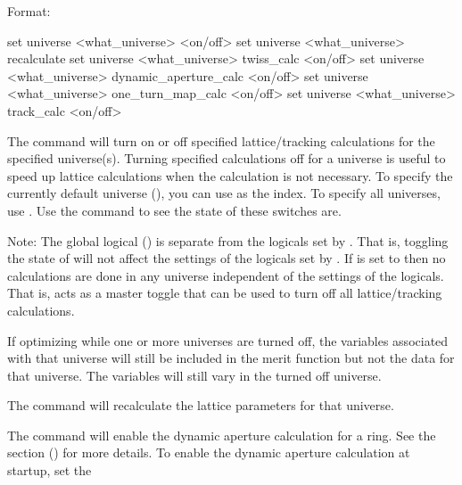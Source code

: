 {{{{{Format:
\begin{example}
  set universe <what_universe> <on/off>
  set universe <what_universe> recalculate
  set universe <what_universe> twiss_calc <on/off>
  set universe <what_universe> dynamic_aperture_calc <on/off>
  set universe <what_universe> one_turn_map_calc <on/off>
  set universe <what_universe> track_calc <on/off>
\end{example}

The  command will turn on or off specified lattice/tracking
calculations for the specified universe(s). Turning specified calculations off for a universe is
useful to speed up lattice calculations when the calculation is not necessary. To specify the
currently default universe (), you can use  as the 
index. To specify all universes, use \vn{*}. Use the  command to see the state of
these switches are.

Note: The global logical  () is separate from the logicals set
by . That is, toggling the state of  will not affect the
settings of the logicals set by . If  is set to  then
no calculations are done in any universe independent of the settings of the 
logicals. That is,  acts as a master toggle that can be used to turn off all
lattice/tracking calculations.

If optimizing while one or more universes are turned off, the variables associated with that
universe will still be included in the merit function but not the data for that universe. The
variables will still vary in the turned off universe.

The  command will recalculate the lattice parameters
for that universe.

The  command will enable the dynamic aperture
calculation for a ring. See the  section () for
more details. To enable the dynamic aperture calculation at startup, set the
\vn{design_lattice(i)%

The \vn{set universe <what_universe> one_turn_map_calc} command will enable a one-turn-map
calculation for a ring using PTC, and populate the normal form taylor maps. See
Eq.~\ref{normalform1} and Eq.~\ref{normalform2} in the \vn{normal.} data type. To enable the map
calculation at startup, set the \vn{design_lattice(i)%
(\sref{s:init.lat}).

}}}}}}}
